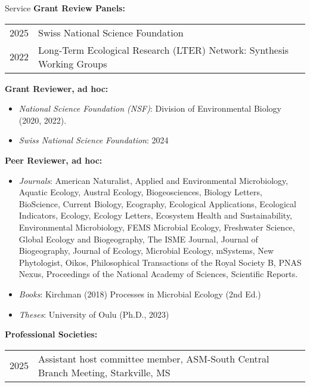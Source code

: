 \documentclass{resume} %
\begin{document}
\begin{rSection}{Service}
{\bf Grant Review Panels:}
\begin{xltabular}{0.95\textwidth}{l>{\raggedright\arraybackslash}X}
2025 & Swiss National Science Foundation\\

2022 & Long-Term Ecological Research (LTER) Network: Synthesis Working Groups
\end{xltabular}

{\bf Grant Reviewer, ad hoc:}
\begin{itemize}
  \item {\em National Science Foundation (NSF)}: Division of Environmental Biology (2020, 2022).
  \item {\em Swiss National Science Foundation}: 2024
\end{itemize}

\bigskip 
{\bf Peer Reviewer, ad hoc:}
\begin{itemize}
\item {\em Journals}: American Naturalist, Applied and Environmental Microbiology, Aquatic Ecology, Austral Ecology, Biogeosciences, Biology Letters, BioScience, Current Biology, Ecography, Ecological Applications, Ecological Indicators, Ecology, Ecology Letters, Ecosystem Health and Sustainability, Environmental Microbiology, FEMS Microbial Ecology, Freshwater Science, Global Ecology and Biogeography, The ISME Journal, Journal of Biogeography, Journal of Ecology, Microbial Ecology, mSystems, New Phytologist, Oikos, Philosophical Transactions of the Royal Society B, PNAS Nexus, Proceedings of the National Academy of Sciences, Scientific Reports.

\item {\em Books}: Kirchman (2018) Processes in Microbial Ecology (2nd Ed.)

\item {\em Theses}: University of Oulu (Ph.D., 2023)
\end{itemize}

\bigskip
{\bf Professional Societies:}
{\def\arraystretch{1}
\begin{xltabular}{0.95\textwidth}{l>{\raggedright\arraybackslash}X}
2025 & Assistant host committee member, ASM-South Central Branch Meeting, Starkville, MS\\


\end{xltabular}}
\end{rSection}
\end{document}
